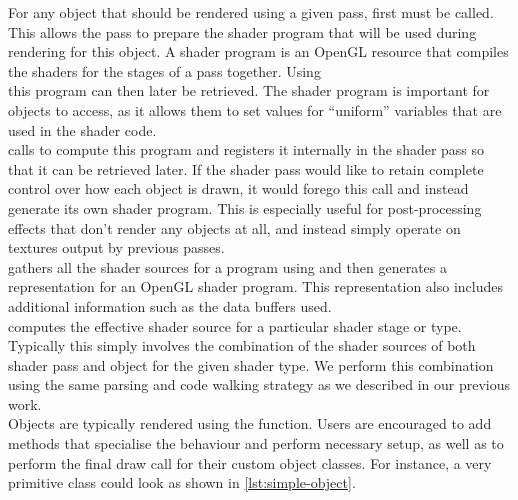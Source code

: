 \documentclass[format=sigconf]{acmart}
\begin{document}
For any object that should be rendered using a given pass, first  must be called. This allows the pass to prepare the shader program that will be used during rendering for this object. A shader program is an OpenGL resource that compiles the shaders for the stages of a pass together. Using \\  this program can then later be retrieved. The shader program is important for objects to access, as it allows them to set values for ``uniform'' variables that are used in the shader code. \\

 calls  to compute this program and registers it internally in the shader pass so that it can be retrieved later. If the shader pass would like to retain complete control over how each object is drawn, it would forego this call and instead generate its own shader program. This is especially useful for post-processing effects that don't render any objects at all, and instead simply operate on textures output by previous passes. \\

 gathers all the shader sources for a program using  and then generates a representation for an OpenGL shader program. This representation also includes additional information such as the data buffers used. \\

 computes the effective shader source for a particular shader stage or type. Typically this simply involves the combination of the shader sources of both shader pass and object for the given shader type. We perform this combination using the same parsing and code walking strategy as we described in our previous work.\cite{glsloop} \\

Objects are typically rendered using the  function. Users are encouraged to add methods that specialise the behaviour and perform necessary setup, as well as to perform the final draw call for their custom object classes. For instance, a very primitive class could look as shown in \autoref{lst:simple-object}. \\
\end{document}
